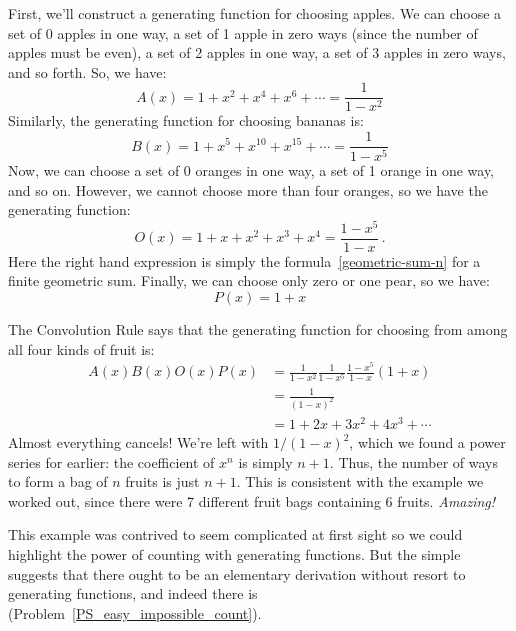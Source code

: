 First, we'll construct a generating function for choosing apples.  We
can choose a set of 0 apples in one way, a set of 1 apple in zero
ways (since the number of apples must be even), a set of 2 apples in
one way, a set of 3 apples in zero ways, and so forth.  So, we have:
%
\[
A(x) = 1 + x^2 + x^4 + x^6 + \cdots = \frac{1}{1 - x^2}
\]
%
Similarly, the generating function for choosing bananas is:
%
\[
B(x) = 1 + x^5 + x^{10} + x^{15} + \cdots = \frac{1}{1 - x^5}
\]
Now, we can choose a set of 0 oranges in one way, a set of 1 orange in
one way, and so on.  However, we cannot choose more than four
oranges, so we have the generating function:
%
\[
O(x) = 1 + x + x^2 + x^3 + x^4 = \frac{1-x^5}{1-x}\, .
\]
Here the right hand expression is simply the
formula~\eqref{geometric-sum-n} for a finite geometric sum.  Finally,
we can choose only zero or one pear, so we have:
%
\[
P(x) = 1 + x
\]

The Convolution Rule says that the generating function for choosing
from among all four kinds of fruit is:
%
\begin{align*}
A(x) B(x) O(x) P(x)
    & = \frac{1}{1-x^2} \frac{1}{1-x^5} \frac{1-x^5}{1-x} (1 + x) \\
    & = \frac{1}{(1-x)^2} \\
    & = 1 + 2x + 3x^2 + 4 x^3 + \cdots
\end{align*}
%
Almost everything cancels!  We're left with $1 / (1-x)^2$, which we
found a power series for earlier: the coefficient of $x^n$ is simply
$n+1$.  Thus, the number of ways to form a bag of $n$ fruits is just
$n+1$.  This is consistent with the example we worked out, since there
were 7 different fruit bags containing 6 fruits.  \textit{Amazing!}

This example was contrived to seem complicated at first sight so we
could highlight the power of counting with generating functions.  But
the simple suggests that there ought to be an elementary derivation
without resort to generating functions, and indeed there is
(Problem~\ref{PS_easy_impossible_count}).

\begin{problems}
\practiceproblems
{}

\classproblems
{}

\homeworkproblems
{}

\end{problems}


